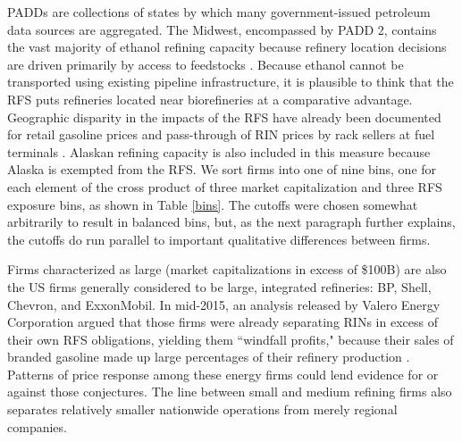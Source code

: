\documentclass[11pt]{article}
\begin{document}
PADDs are collections of states by which many government-issued petroleum data sources are aggregated. The Midwest, encompassed by PADD 2, contains the vast majority of ethanol refining capacity because refinery location decisions are driven primarily by access to feedstocks \citep{Lambert2008}. Because ethanol cannot be transported using existing pipeline infrastructure, it is plausible to think that the RFS puts refineries located near biorefineries at a comparative advantage. Geographic disparity in the impacts of the RFS have already been documented for retail gasoline prices \citep{LaRiviere2017} and pass-through of RIN prices by rack sellers at fuel terminals \citep{Pouliot2017}. Alaskan refining capacity is also included in this measure because Alaska is exempted from the RFS. We sort firms into one of nine bins, one for each element of the cross product of three market capitalization and three RFS exposure bins, as shown in Table \ref{bins}. The cutoffs were chosen somewhat arbitrarily to result in balanced bins, but, as the next paragraph further explains, the cutoffs do run parallel to important qualitative differences between firms.

Firms characterized as large (market capitalizations in excess of \$100B) are also the US firms generally considered to be large, integrated refineries: BP, Shell, Chevron, and ExxonMobil. In mid-2015, an analysis released by Valero Energy Corporation argued that those firms were already separating RINs in excess of their own RFS obligations, yielding them ``windfall profits," because their sales of branded gasoline made up large percentages of their refinery production \citep{ValeroEnergyCorporation2016}. Patterns of price response among these energy firms could lend evidence for or against those conjectures. The line between small and medium refining firms also separates relatively smaller nationwide operations from merely regional companies. 
\end{document}
